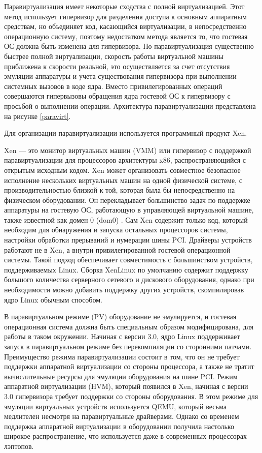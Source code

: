 Паравиртуализация имеет некоторые сходства с полной виртуализацией.
Этот метод использует гипервизор для разделения доступа к основным аппаратным средствам, но объединяет код, касающийся виртуализации, в непосредственно операционную систему, поэтому недостатком метода является то, что гостевая ОС должна быть изменена для гипервизора.
Но паравиртуализация существенно быстрее полной виртуализации, скорость работы виртуальной машины приближена к скорости реальной, это осуществляется за счет отсутствия эмуляции аппаратуры и учета существования гипервизора при выполнении системных вызовов в коде ядра.
Вместо привилегированных операций совершаются гипервызовы обращения ядра гостевой ОС к гипервизору с просьбой о выполнении операции.
Архитектура паравиртуализации представлена на рисунке \ref{paravirt}.

Для организации паравиртуализации используется программный продукт Xen.

Xen --- это монитор виртуальных машин (VMM) или гипервизор с поддержкой паравиртуализации для процессоров архитектуры x86, распространяющийся с открытым исходным кодом.
Xen может организовать совместное безопасное исполнение нескольких виртуальных машин на одной физической системе, с производительностью близкой к той, которая была бы непосредственно на физическом оборудовании.
Он перекладывает большинство задач по поддержке аппаратуры на гостевую ОС, работающую в управляющей виртуальной машине, также известной как домен 0 (dom0) \cite{xen-xguru}.
Сам Xen содержит только код, который необходим для обнаружения и запуска остальных процессоров системы, настройки обработки прерываний и нумерации шины PCI.
Драйверы устройств работают не в Xen, а внутри привилегированной гостевой операционной системы.
Такой подход обеспечивает совместимость с большинством устройств, поддерживаемых Linux.
Сборка XenLinux по умолчанию содержит поддержку большого количества серверного сетевого и дискового оборудования, однако при необходимости можно добавить поддержку других устройств, скомпилировав ядро Linux обычным способом.

В паравиртуальном режиме (PV) оборудование не эмулируется, и гостевая операционная система должна быть специальным образом модифицирована, для работы в таком окружении.
Начиная с версии 3.0, ядро Linux поддерживает запуск в паравиртуальном режиме без перекомпиляции со сторонними патчами.
Преимущество режима паравиртуализации состоит в том, что он не требует поддержки аппаратной виртуализации со стороны процессора, а также не тратит вычислительные ресурсы для эмуляции оборудования на шине PCI.
Режим аппаратной виртуализации (HVM), который появился в Xen, начиная с версии 3.0 гипервизора требует поддержки со стороны оборудования.
В этом режиме для эмуляции виртуальных устройств используется QEMU, который весьма медлителен несмотря на паравиртуальные драйверами.
Однако со временем поддержка аппаратной виртуализации в оборудовании получила настолько широкое распространение, что используется даже в современных процессорах лэптопов.

